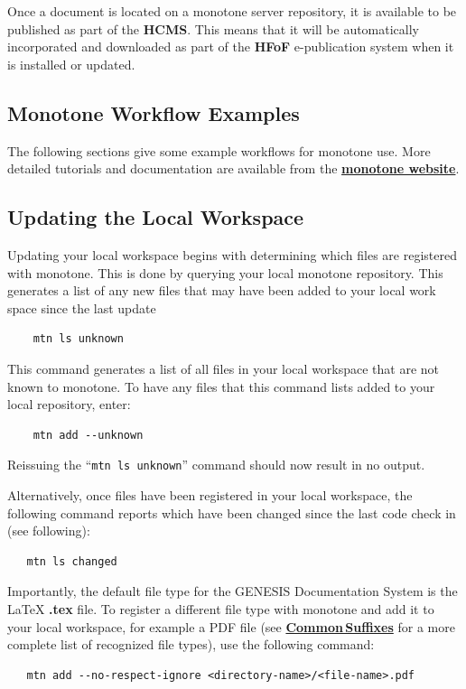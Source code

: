 \documentclass[12pt]{article}
\begin{document}
Once a document is located on a monotone server repository, it is available to be published as part of the {\bf \small HCMS}. This means that it will be automatically incorporated and downloaded as part of the {\bf \small HFoF} e-publication system when it is installed or updated. 

\subsection{Monotone Workflow Examples}
The following sections give some example workflows for monotone use. More detailed tutorials and documentation are available from the \href{http://www.monotone.ca/docs/index.html}{\bf monotone website}.

\subsection{Updating the Local Workspace}

Updating your local workspace begins with determining which files are registered with monotone. This is done by querying your local monotone repository. This generates a list of any new files that may have been added to your local work space since the last update
\begin{verbatim}
    mtn ls unknown
\end{verbatim}
This command generates a list of all files in your local workspace that are not known to monotone. To have any files that this command lists added to your local repository, enter:
\begin{verbatim}
    mtn add --unknown
\end{verbatim}
Reissuing the ``{\tt mtn ls unknown}'' command should now result in no output.

Alternatively, once files have been registered in your local workspace, the following command reports which have been changed since the last code check in (see following):
\begin{verbatim}
   mtn ls changed
\end{verbatim}

Importantly, the default file type for the GENESIS Documentation System is the \LaTeX\,\,{\bf .tex} file. To register a different file type with monotone and add it to your local workspace, for example a PDF file (see \href{../common-suffixes/common-suffixes.tex}{\bf Common\,Suffixes} for a more complete list of recognized file types), use the following command:
\begin{verbatim}
   mtn add --no-respect-ignore <directory-name>/<file-name>.pdf
\end{verbatim}
\end{document}
